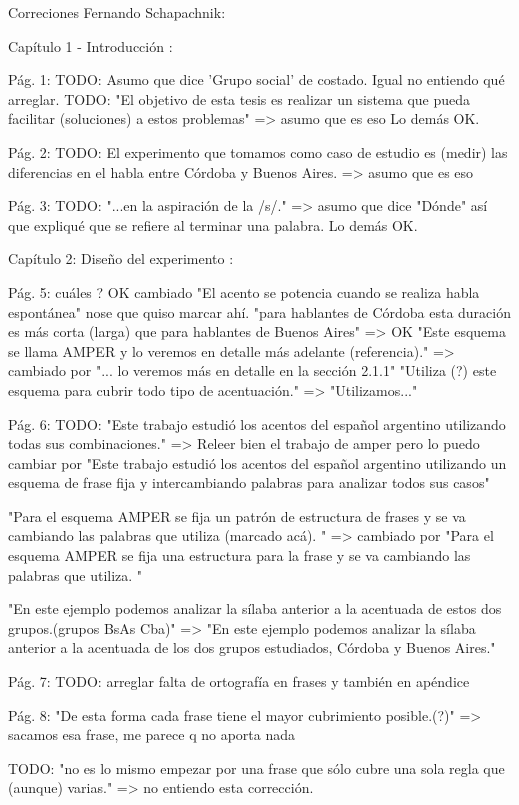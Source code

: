 Correciones Fernando Schapachnik:

Capítulo 1 - Introducción :

Pág. 1:
TODO: Asumo que dice 'Grupo social' de costado. Igual no entiendo qué arreglar.
TODO: "El objetivo de esta tesis es realizar un sistema que pueda facilitar (soluciones) a estos problemas" => asumo que es eso
Lo demás OK. 

Pág. 2:
TODO: El experimento que tomamos como caso de estudio es (medir) las diferencias en el habla entre Córdoba y Buenos Aires. => asumo que es eso

Pág. 3:
TODO: "...en la aspiración de la /s/." => asumo que dice "Dónde" así que expliqué que se refiere al terminar una palabra.
Lo demás OK.

Capítulo 2: Diseño del experimento :

Pág. 5: 
cuáles ? OK cambiado 
"El acento se potencia cuando se realiza habla espontánea" nose que quiso marcar ahí.
"para hablantes de Córdoba esta duración es más corta (larga) que para hablantes de Buenos Aires" => OK
"Este esquema se llama AMPER \cite{amper} y lo veremos en detalle más adelante (referencia)." => cambiado por "... lo veremos más en detalle en la sección 2.1.1"
"Utiliza (?) este esquema para cubrir todo tipo de acentuación." => "Utilizamos..."


Pág. 6:
TODO: "Este trabajo estudió los acentos del español argentino utilizando todas sus combinaciones." => Releer bien el trabajo de amper pero lo puedo cambiar por "Este trabajo estudió los acentos del español argentino utilizando un esquema de frase fija y intercambiando palabras para analizar todos sus casos" 

"Para el esquema AMPER se fija un patrón de estructura de frases y se va cambiando las palabras que utiliza (marcado acá). " => cambiado por "Para el esquema AMPER se fija una estructura para la frase y se va cambiando las palabras que utiliza. " 

"En este ejemplo podemos analizar la sílaba anterior a la acentuada de estos dos grupos.(grupos BsAs Cba)" => "En este ejemplo podemos analizar la sílaba anterior a la acentuada de los dos grupos estudiados, Córdoba y Buenos Aires." 

Pág. 7:
TODO: arreglar falta de ortografía en frases y también en apéndice

Pág. 8:
"De esta forma cada frase tiene el mayor cubrimiento posible.(?)" => sacamos esa frase, me parece q no aporta nada

TODO: "no es lo mismo empezar por una frase que sólo cubre una sola regla que (aunque) varias." => no entiendo esta corrección.

